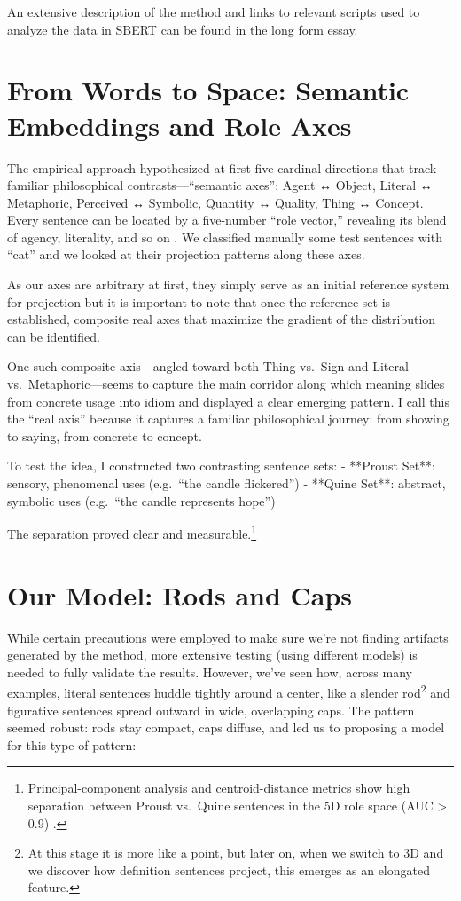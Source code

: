 \documentclass[12pt]{article}
\begin{document}
An extensive description of the method and links to relevant scripts used to analyze the data in SBERT can be found in the long form essay.

\section{From Words to Space: Semantic Embeddings and Role Axes}\label{from-words-to-space-semantic-embeddings-and-role-axes}

The empirical approach hypothesized at first five cardinal directions that track familiar philosophical contrasts---``semantic axes'': Agent ↔ Object, Literal ↔ Metaphoric, Perceived ↔ Symbolic, Quantity ↔ Quality, Thing ↔ Concept. Every sentence can be located by a five-number ``role vector,'' revealing its blend of agency, literality, and so on \cite{ref-milliereBuckner2024}. We classified manually some test sentences with ``cat'' and we looked at their projection patterns along these axes.

As our axes are arbitrary at first, they simply serve as an initial reference system for projection but it is important to note that once the reference set is established, composite real axes that maximize the gradient of the distribution can be identified.

One such composite axis---angled toward both Thing vs.~Sign and Literal vs.~Metaphoric---seems to capture the main corridor along which meaning slides from concrete usage into idiom and displayed a clear emerging pattern. I call this the ``real axis'' because it captures a familiar philosophical journey: from showing to saying, from concrete to concept.

To test the idea, I constructed two contrasting sentence sets:
- **Proust Set**: sensory, phenomenal uses (e.g.~``the candle flickered'')
- **Quine Set**: abstract, symbolic uses (e.g.~``the candle represents hope'')

The separation proved clear and measurable.\footnote{Principal-component analysis and centroid-distance metrics show high separation between Proust vs.~Quine sentences in the 5D role space (AUC \textgreater{} 0.9) \cite{ref-milliereBuckner2024}.}

\section{Our Model: Rods and Caps}\label{our-model-rods-and-caps}

While certain precautions were employed to make sure we're not finding artifacts generated by the method, more extensive testing (using different models) is needed to fully validate the results. However, we've seen how, across many examples, literal sentences huddle tightly around a center, like a slender rod\footnote{At this stage it is more like a point, but later on, when we switch to 3D and we discover how definition sentences project, this emerges as an elongated feature.} and figurative sentences spread outward in wide, overlapping caps. The pattern seemed robust: rods stay compact, caps diffuse, and led us to proposing a model for this type of pattern:
\end{document}
